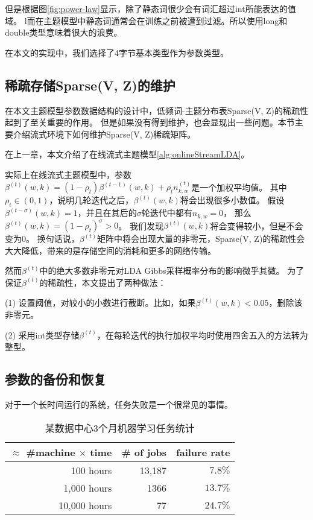 但是根据图\ref{fig:power-law}显示，除了静态词很少会有词汇超过int所能表达的值域。
l而在主题模型中静态词通常会在训练之前被遭到过滤。所以使用long和double类型意味着很大的浪费。

在本文的实现中，我们选择了4字节基本类型作为参数类型。

\subsection{稀疏存储Sparse(V, Z)的维护}
在本文主题模型参数数据结构的设计中，低频词-主题分布表Sparse(V, Z)的稀疏性起到了至关重要的作用。
但是如果没有得到维护，也会显现出一些问题。本节主要介绍流式环境下如何维护Sparse(V, Z)稀疏矩阵。

在上一章，本文介绍了在线流式主题模型\ref{alg:onlineStreamLDA}。

实际上在线流式主题模型中，参数$\beta^{(t)}(w, k) = (1 - \rho_t) \beta^{(t-1)}(w, k) + \rho_t n_{k, w}^{(t)}$是一个加权平均值。
其中$\rho_t \in (0, 1)$，说明几轮迭代之后，$\beta^{(t)}(w, k)$将会出现很多小数值。
假设$\beta^{(t-\sigma)}(w, k) = 1$，并且在其后的$\sigma$轮迭代中都有$n_{k,w} = 0$，
那么$\beta^{(t)}(w, k) = (1 - \rho_t)^{\sigma} > 0 $。
我们发现$\beta^{(t)}(w, k)$将会变得较小，但是不会变为0。
换句话说，$\beta^{(t)}$矩阵中将会出现大量的非零元，Sparse(V, Z)的稀疏性会大大降低，带来的是存储空间的消耗和更多的网络传输。

然而$\beta^{(t)}$中的绝大多数非零元对LDA Gibbs采样概率分布的影响微乎其微。
为了保证$\beta^{(t)}$的稀疏性，本文提出了两种做法：

(1) 设置阈值，对较小的小数进行截断。比如，如果$\beta^{(t)}(w, k) < 0.05$，删除该非零元。

(2) 采用int类型存储$\beta^{(t)}$，在每轮迭代的执行加权平均时使用四舍五入的方法转为整型。


\subsection{参数的备份和恢复}

对于一个长时间运行的系统，任务失败是一个很常见的事情。
\begin{table}\label{tab:jobs_failed} 
\center
\caption{某数据中心3个月机器学习任务统计}
\begin{tabular}{|r|r|r|}
\hline
$\approx$ \#machine $\times$ time & \# of jobs& failure rate \\
\hline
100 hours & 13,187 & $7.8\%$ \\
1,000 hours & 1366 & $13.7\%$ \\
10,000 hours & 77 & $24.7\%$ \\
\hline
\end{tabular}
\end{table}

